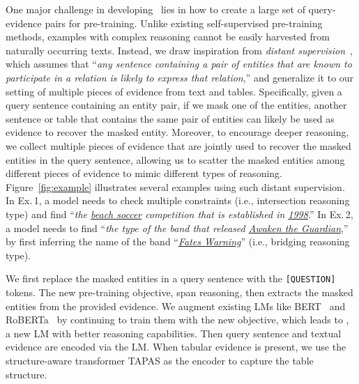 \documentclass[11pt]{article}
\newcommand{\revise}[1]{#1}
\newcommand{\nop}[1]{}
\newcommand{\ours}[0]{\text{ReasonBERT}}
\begin{document}
\nop{Inspired by the QA task, which has become an important testbed for evaluating how well NLP models can understand and reason with languages \cite{xx}, we pre-train the model to answer a question based on given evidence. In this work, we simulate questions by masking entities in a query sentence and treat the masked entities as answers, and pre-train the model to extract the answers from relevant evidence.}

One major challenge in developing \ours\ lies in how to create a large set of query-evidence pairs for pre-training.
Unlike existing self-supervised pre-training methods, examples with complex reasoning cannot be easily harvested from naturally occurring texts. 
Instead, we draw inspiration from  \emph{distant supervision}~\cite{mintz2009distant}, which assumes that ``\textit{any sentence containing a pair of entities that are known to participate in a relation is likely to express that relation},'' and generalize it to our setting of multiple pieces of evidence from text and tables.
Specifically, given a query sentence containing an entity pair, if we mask one of the entities, another sentence or table that contains the same pair of entities can likely be used as evidence to recover the masked entity. Moreover, to encourage deeper reasoning, we collect multiple pieces of evidence that are jointly used to recover the masked entities in the query sentence, allowing us to scatter the masked entities among different \nop{sets}{pieces} of evidence to mimic different types of reasoning. Figure~\ref{fig:example} illustrates several examples using such distant supervision. In Ex.\,1, a model needs to check multiple constraints (i.e., intersection reasoning type) and find ``\textit{the \ul{beach soccer} competition that is established in \ul{1998}}.'' In Ex.\,2, a model needs to find ``\textit{the type of the band that released \ul{Awaken the Guardian}},'' by first inferring the name of the band ``\textit{\ul{Fates Warning}}'' (i.e., bridging reasoning type). 

We first replace the masked entities in a query sentence with the \texttt{[QUESTION]} tokens. The new pre-training objective, span reasoning, \nop{is then to extract}\revise{then extracts} the masked entities from the provided evidence. We augment existing LMs like BERT~\cite{devlin-etal-2019-bert} and RoBERTa~\cite{Liu2019RoBERTaAR} by continuing to train them with the new objective, which leads to \ours, a new LM with better reasoning capabilities.\nop{ We use a transformer based encoder~\cite{devlin-etal-2019-bert} to encode the concatenated query sentence and textual evidence.} Then query sentence and textual evidence are encoded via the LM. When tabular evidence is present, we use the structure-aware transformer TAPAS \cite{herzig-etal-2020-tapas} as the encoder to capture the table structure.
\end{document}
